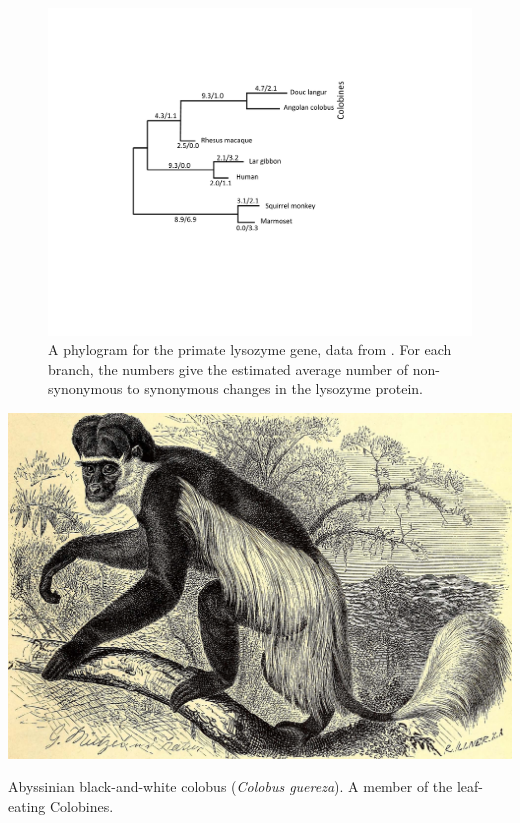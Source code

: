 \begin{figure}
\begin{center}
\includegraphics[width=0.8 \textwidth]{Journal_figs/genetic_drift/Yang_lysozyme/Yang_lysozyme.pdf}
\end{center}
\caption{A phylogram for the primate lysozyme gene, data from
  \citet{Yang:98}. For each branch, the numbers give the estimated average
number of non-synonymous to synonymous changes in the lysozyme protein.} \label{fig:lysozyme}
\end{figure}
\begin{marginfigure}
\begin{center}
\includegraphics[width=0.8 \textwidth]{illustration_images/Genetic_drift/Colobus/19792029373_fcce706e67_k.jpg}
\end{center}
\caption{Abyssinian black-and-white colobus ({\it Colobus guereza}). A member of the leaf-eating Colobines. } \label{fig:Colobus}
\end{marginfigure}


